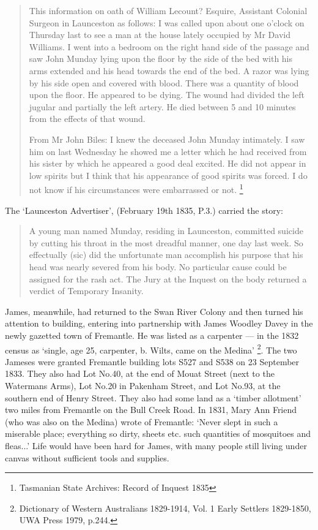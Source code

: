 \begin{quotation}
This information on oath of William Lecount? Esquire, Assistant Colonial Surgeon in Launceston as follows: I was called upon about one o'clock on Thursday last to see a man at the house lately occupied by Mr David Williams. I went into a bedroom on the right hand side of the passage and saw John Munday lying upon the floor by the side of the bed with his arms extended and his head towards the end of the bed. A razor was lying by his side open and covered with blood. There was a quantity of blood upon the floor. He appeared to be dying. The wound had divided the left jugular and partially the left artery. He died between 5 and 10 minutes from the effects of that wound.

From Mr John Biles: I knew the deceased John Munday intimately. I saw him on last Wednesday he showed me a letter which he had received from his sister by which he appeared a good deal excited. He did not appear in low spirits but I think that his appearance of good spirits was forced. I do not know if his circumstances were embarrassed or not. \footnote{Tasmanian State Archives: Record of Inquest 1835}
\end{quotation}

The `Launceston Advertiser', (February 19th 1835, P.3.) carried the story:
\begin{quotation}
A young man named Munday, residing in Launceston, committed suicide by cutting his throat in the most dreadful manner, one day last week. So effectually (sic) did the unfortunate man accomplish his purpose that his head was nearly severed from his body. No particular cause could be assigned for the rash act. The Jury at the Inquest on the body returned a verdict of Temporary Insanity.
\end{quotation}

James, meanwhile, had returned to the Swan River Colony and then turned his attention to building, entering into partnership with James Woodley Davey in the newly gazetted town of Fremantle. He was listed as a carpenter — in the 1832 census as `single, age 25, carpenter, b. Wilts, came on the Medina' \footnote{Dictionary of Western Australians 1829-1914, Vol. 1 Early Settlers 1829-1850, UWA Press 1979, p.244.}. The two Jameses were granted Fremantle building lots S527 and S538 on 23 September 1833. They also had Lot No.40, at the end of Mouat Street (next to the Watermans Arms), Lot No.20 in Pakenham Street, and Lot No.93, at the southern end of Henry Street. They also had some land as a `timber allotment' two miles from Fremantle on the Bull Creek Road. In 1831, Mary Ann Friend (who was also on the Medina) wrote of Fremantle: `Never slept in such a miserable place; everything so dirty, sheets etc. such quantities of mosquitoes and fleas...'  Life would have been hard for James, with many people still living under canvas without sufficient tools and supplies. 

